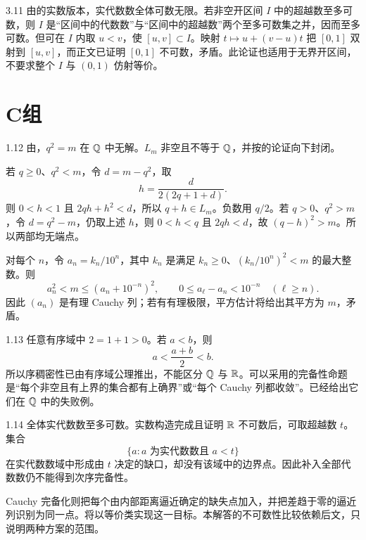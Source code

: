 \begin{solution}{3.11}
由的实数版本，实代数数全体可数无限。若非空开区间 \(I\) 中的超越数至多可数，则 \(I\) 是“区间中的代数数”与“区间中的超越数”两个至多可数集之并，因而至多可数。但可在 \(I\) 内取 \(u<v\)，使 \([u,v]\subset I\)。映射 \(t\mapsto u+(v-u)t\) 把 \([0,1]\) 双射到 \([u,v]\)，而正文已证明 \([0,1]\) 不可数，矛盾。此论证也适用于无界开区间，不要求整个 \(I\) 与 \((0,1)\) 仿射等价。
\end{solution}

\section*{C组}

\begin{solution}{1.12}
由，\(q^2=m\) 在 \(\mathbb{Q}\) 中无解。\(L_m\) 非空且不等于 \(\mathbb{Q}\)，并按的论证向下封闭。

若 \(q\ge0\)、\(q^2<m\)，令 \(d=m-q^2\)，取
\[
 h=\frac{d}{2(2q+1+d)}.
\]
则 \(0<h<1\) 且 \(2qh+h^2<d\)，所以 \(q+h\in L_m\)。负数用 \(q/2\)。若 \(q>0\)、\(q^2>m\)，令 \(d=q^2-m\)，仍取上述 \(h\)，则 \(0<h<q\) 且 \(2qh<d\)，故 \((q-h)^2>m\)。所以两部均无端点。

对每个 \(n\)，令 \(a_n=k_n/10^n\)，其中 \(k_n\) 是满足 \(k_n\ge0\)、\((k_n/10^n)^2<m\) 的最大整数。则
\[
 a_n^2<m\le(a_n+10^{-n})^2,\qquad
 0\le a_\ell-a_n<10^{-n}\quad(\ell\ge n).
\]
因此 \((a_n)\) 是有理 Cauchy 列；若有有理极限，平方估计将给出其平方为 \(m\)，矛盾。
\end{solution}

\begin{solution}{1.13}
任意有序域中 \(2=1+1>0\)。若 \(a<b\)，则
\[
 a<\frac{a+b}{2}<b.
\]
所以序稠密性已由有序域公理推出，不能区分 \(\mathbb{Q}\) 与 \(\mathbb{R}\)。可以采用的完备性命题是“每个非空且有上界的集合都有上确界”或“每个 Cauchy 列都收敛”。已经给出它们在 \(\mathbb{Q}\) 中的失败例。
\end{solution}

\begin{solution}{1.14}
全体实代数数至多可数。实数构造完成且证明 \(\mathbb{R}\) 不可数后，可取超越数 \(t\)。集合
\[
 \{a:a\text{ 为实代数数且 }a<t\}
\]
在实代数数域中形成由 \(t\) 决定的缺口，却没有该域中的边界点。因此补入全部代数数仍不能得到次序完备性。

Cauchy 完备化则把每个由内部距离逼近确定的缺失点加入，并把差趋于零的逼近列识别为同一点。将以等价类实现这一目标。本解答的不可数性比较依赖后文，只说明两种方案的范围。
\end{solution}

